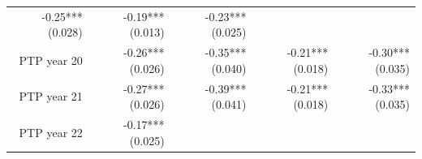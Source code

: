 \documentclass[]{article}
\begin{document}
\begin{longtable}[c]{@{}rrrrr@{}}
\begin{minipage}[t]{0.16\columnwidth}
-0.25*** (0.028)
\strut\end{minipage} &
\begin{minipage}[t]{0.18\columnwidth}\raggedleft\strut
-0.19*** (0.013)
\strut\end{minipage} &
\begin{minipage}[t]{0.15\columnwidth}\raggedleft\strut
-0.23*** (0.025)
\strut\end{minipage}\tabularnewline
\begin{minipage}[t]{0.17\columnwidth}\raggedleft\strut
PTP year 20
\strut\end{minipage} &
\begin{minipage}[t]{0.20\columnwidth}\raggedleft\strut
-0.26*** (0.026)
\strut\end{minipage} &
\begin{minipage}[t]{0.16\columnwidth}\raggedleft\strut
-0.35*** (0.040)
\strut\end{minipage} &
\begin{minipage}[t]{0.18\columnwidth}\raggedleft\strut
-0.21*** (0.018)
\strut\end{minipage} &
\begin{minipage}[t]{0.15\columnwidth}\raggedleft\strut
-0.30*** (0.035)
\strut\end{minipage}\tabularnewline
\begin{minipage}[t]{0.17\columnwidth}\raggedleft\strut
PTP year 21
\strut\end{minipage} &
\begin{minipage}[t]{0.20\columnwidth}\raggedleft\strut
-0.27*** (0.026)
\strut\end{minipage} &
\begin{minipage}[t]{0.16\columnwidth}\raggedleft\strut
-0.39*** (0.041)
\strut\end{minipage} &
\begin{minipage}[t]{0.18\columnwidth}\raggedleft\strut
-0.21*** (0.018)
\strut\end{minipage} &
\begin{minipage}[t]{0.15\columnwidth}\raggedleft\strut
-0.33*** (0.035)
\strut\end{minipage}\tabularnewline
\begin{minipage}[t]{0.17\columnwidth}\raggedleft\strut
PTP year 22
\strut\end{minipage} &
\begin{minipage}[t]{0.20\columnwidth}\raggedleft\strut
-0.17*** (0.025)
\strut\end{minipage} &
\begin{minipage}[t]{0.16\columnwidth}\raggedleft\strut

\end{minipage}
\end{longtable}
\end{document}
